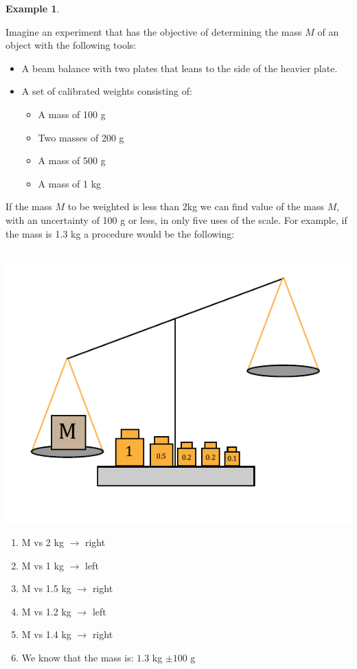 \documentclass[11pt,a4paper,twoside]{report}
\newcommand{\+}{\textnormal{+} }
\theoremstyle{definition}
\newtheorem{myex}[mythm]{Example}
\numberwithin{equation}{chapter}
\begin{document}
\begin{myex} \label{scalex}
  
  Imagine an experiment that has the objective of determining the mass $M$ of an
  object with the following tools:
  
  \begin{itemize}
    \item A beam balance with two plates that leans to the side of the heavier
    plate. 
    \item A set of calibrated weights consisting of:
    \begin{itemize}
      \item A mass of 100 g
      \item Two masses of 200 g
      \item A mass of 500 g
      \item A mass of 1 kg
    \end{itemize}  
  \end{itemize}

If the mass $M$ to be weighted is less than $2$kg we can find value of the mass
$M$, with an uncertainty of 100 g or less, in only five uses of the scale. For
example, if the mass is 1.3 kg a procedure would be the following:
\\\\
\begin{minipage}[]{0.5\linewidth}
  \centering
  \strut\vspace*{-\baselineskip}\newline\includegraphics[width=0.8\linewidth]{figures/scale.pdf}
\end{minipage}
\begin{minipage}[]{0.4\linewidth}
  \begin{enumerate}
  \item M vs 2 kg $\rightarrow$ right
  \item M vs 1 kg $\rightarrow$ left
  \item  M vs 1.5 kg $\rightarrow$ right
  \item  M vs 1.2 kg $\rightarrow$ left
  \item  M vs 1.4 kg $\rightarrow$ right
  \item  We know that the mass is: $1.3$ kg $\pm 100$ g
\end{enumerate}
\end{minipage}
\\\\


\end{myex}
\end{document}
